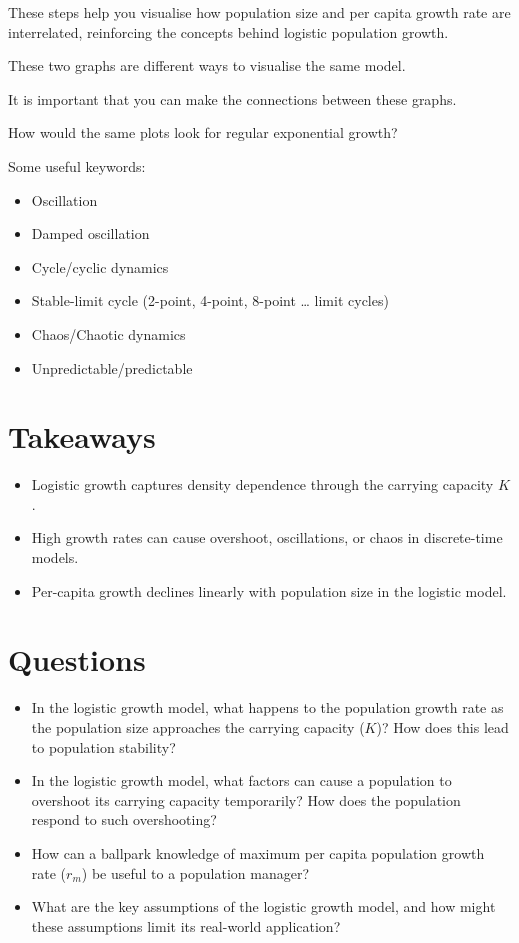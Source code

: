 \documentclass[
  a4paper]{book}
\providecommand{\tightlist}{%
  \setlength{\itemsep}{0pt}\setlength{\parskip}{0pt}}
\begin{document}
These steps help you visualise how population size and per capita growth rate are interrelated, reinforcing the concepts behind logistic population growth.

These two graphs are different ways to visualise the same model.

It is important that you can make the connections between these graphs.

How would the same plots look for regular exponential growth?

Some useful keywords:

\begin{itemize}
\tightlist
\item
  Oscillation
\item
  Damped oscillation
\item
  Cycle/cyclic dynamics
\item
  Stable-limit cycle (2-point, 4-point, 8-point \ldots{} limit cycles)
\item
  Chaos/Chaotic dynamics
\item
  Unpredictable/predictable
\end{itemize}

\section{Takeaways}\label{takeaways-5}

\begin{itemize}
\tightlist
\item
  Logistic growth captures density dependence through the carrying capacity \(K\).
\item
  High growth rates can cause overshoot, oscillations, or chaos in discrete-time models.
\item
  Per-capita growth declines linearly with population size in the logistic model.
\end{itemize}

\section{Questions}\label{questions-5}

\begin{itemize}
\item
  In the logistic growth model, what happens to the population growth rate as the population size approaches the carrying capacity (\(K\))? How does this lead to population stability?
\item
  In the logistic growth model, what factors can cause a population to overshoot its carrying capacity temporarily? How does the population respond to such overshooting?
\item
  How can a ballpark knowledge of maximum per capita population growth rate (\(r_m\)) be useful to a population manager?
\item
  What are the key assumptions of the logistic growth model, and how might these assumptions limit its real-world application?
\end{itemize}
\end{document}
